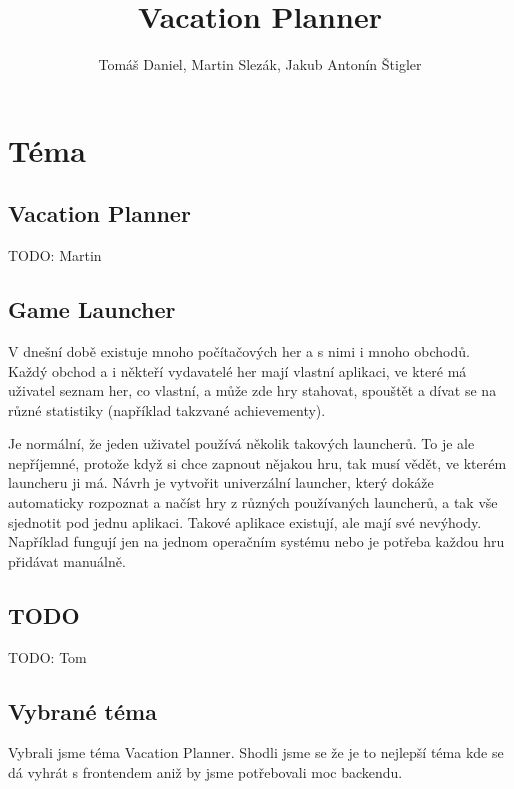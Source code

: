 \documentclass{article}
\title{Vacation Planner}
\author{Tomáš Daniel, Martin Slezák, Jakub Antonín Štigler}
\begin{document}
\maketitle

\newpage

\section{Téma}

\subsection{Vacation Planner}
TODO: Martin

\subsection{Game Launcher}
V dnešní době existuje mnoho počítačových her a s nimi i mnoho obchodů.
Každý obchod a i někteří vydavatelé her mají vlastní aplikaci, ve které má
uživatel seznam her, co vlastní, a může zde hry stahovat, spouštět a dívat se
na různé statistiky (například takzvané achievementy).

Je normální, že jeden uživatel používá několik takových launcherů. To je ale
nepříjemné, protože když si chce zapnout nějakou hru, tak musí vědět, ve kterém
launcheru ji má. Návrh je vytvořit univerzální launcher, který dokáže
automaticky rozpoznat a načíst hry z různých používaných launcherů, a tak vše
sjednotit pod jednu aplikaci. Takové aplikace existují, ale mají své nevýhody.
Například fungují jen na jednom operačním systému nebo je potřeba každou hru
přidávat manuálně.

\subsection{TODO}
TODO: Tom

\subsection{Vybrané téma}
Vybrali jsme téma Vacation Planner. Shodli jsme se že je to nejlepší téma kde
se dá vyhrát s frontendem aniž by jsme potřebovali moc backendu.
\end{document}
